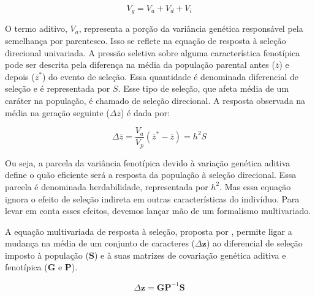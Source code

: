 \begin{equation}
    V_g = V_a + V_d + V_i
    \label{compgen}
\end{equation}

O termo aditivo, $V_a$, representa a porção da variância genética
responsável pela semelhança por parentesco.
Isso se reflete na equação de resposta à seleção direcional univariada.
A pressão seletiva sobre alguma característica fenotípica pode ser descrita
pela diferença na média da população parental antes ($\overline z$) e depois
($\overline z^*$) do evento de seleção.
Essa quantidade é denominada diferencial de seleção e é representada por
$S$.
Esse tipo de seleção, que afeta média de um caráter na população, é
chamado de seleção direcional.
A resposta observada na média na geração seguinte ($\Delta \overline z$) é dada
por:

\begin{equation}
    \Delta \overline z = \frac{V_a}{V_p} (\overline z^* - \overline z) = h^2S
\end{equation}

Ou seja, a parcela da variância fenotípica devido à variação genética
aditiva define o quão eficiente será a resposta da população à seleção
direcional.
Essa parcela é denominada herdabilidade, representada por $h^2$.
Mas essa equação ignora o efeito de seleção indireta em outras
características do indivíduo.
Para levar em conta esses efeitos, devemos
lançar mão de um formalismo multivariado.

A equação multivariada de resposta à seleção,
proposta por \cite{Lande1979}, permite ligar a mudança na média de um
conjunto de caracteres ($\Delta \mathbf{z}$) ao diferencial de seleção imposto à população
($\mathbf{S}$) e à suas matrizes de covariação genética aditiva e fenotípica
($\mathbf{G}$ e $\mathbf{P}$).

\begin{equation}
    \Delta \mathbf{z} = \mathbf{GP}^{-1}\mathbf{S}
    \label{landeZGS}
\end{equation}
 
